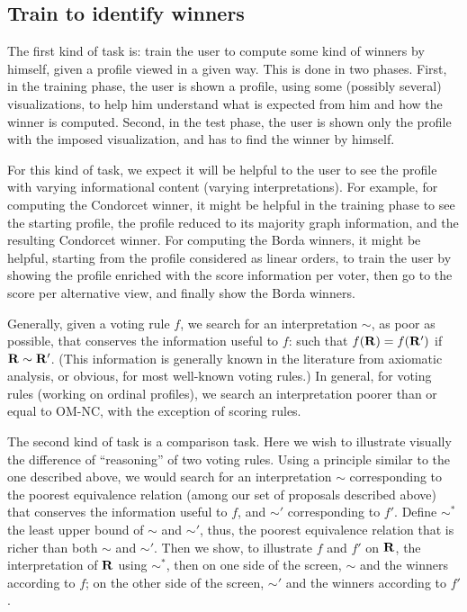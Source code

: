 \documentclass[version=last, pagesize, twoside=off, bibliography=totoc, DIV=calc, fontsize=12pt, a4paper, french, english]{scrartcl}
\begin{document}
\subsection{Train to identify winners}
The first kind of task is: train the user to compute some kind of winners by himself, given a profile viewed in a given way. This is done in two phases. First, in the training phase, the user is shown a profile, using some (possibly several) visualizations, to help him understand what is expected from him and how the winner is computed. Second, in the test phase, the user is shown only the profile with the imposed visualization, and has to find the winner by himself.

For this kind of task, we expect it will be helpful to the user to see the profile with varying informational content (varying interpretations). For example, for computing the Condorcet winner, it might be helpful in the training phase to see the starting profile, the profile reduced to its majority graph information, and the resulting Condorcet winner. For computing the Borda winners, it might be helpful, starting from the profile considered as linear orders, to train the user by showing the profile enriched with the score information per voter, then go to the score per alternative view, and finally show the Borda winners.

Generally, given a voting rule $f$, we search for an interpretation $\sim$, as poor as possible, that conserves the information useful to $f$: such that $f(\mathbf{R}) = f(\mathbf{R}')$ if $\mathbf{R} \sim \mathbf{R}'$. (This information is generally known in the literature from axiomatic analysis, or obvious, for most well-known voting rules.) In general, for voting rules (working on ordinal profiles), we search an interpretation poorer than or equal to OM-NC, with the exception of scoring rules. 

The second kind of task is a comparison task.  Here we wish to illustrate visually the difference of “reasoning” of two voting rules. Using a principle similar to the one described above, we would search for an interpretation $\sim$ corresponding to the poorest equivalence relation (among our set of proposals described above) that conserves the information useful to $f$, and $\sim'$ corresponding to $f'$. Define $\sim^*$ the least upper bound of $\sim$ and $\sim'$, thus, the poorest equivalence relation that is richer than both $\sim$ and $\sim'$. Then we show, to illustrate $f$ and $f'$ on $\mathbf{R}$, the interpretation of $\mathbf{R}$ using $\sim^*$, then on one side of the screen, $\sim$ and the winners according to $f$; on the other side of the screen, $\sim'$ and the winners according to $f'$.
\end{document}
